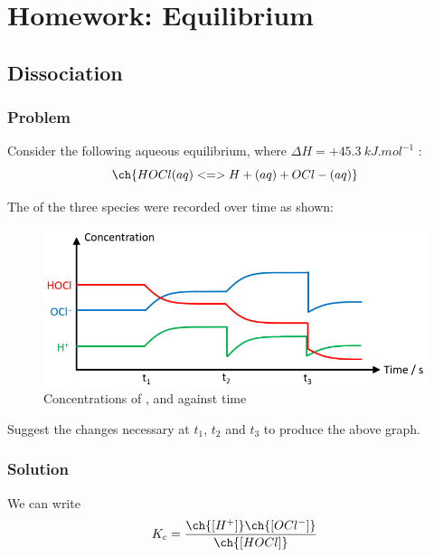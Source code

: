 \documentclass[12pt, a4paper, twoside]{pancake-book}
\begin{document}
\section{Homework: Equilibrium}
\subsection{Dissociation}
\subsubsection{Problem}
Consider the following aqueous equilibrium,
where \(\Delta H = +\qty{45.3}{kJ.mol^{-1}}\)
:
\begin{equation}
	\ch{HOCl (aq) <=> H+ (aq) + OCl- (aq)}
	\label{eq:hocl}
\end{equation}

The  of the three species were recorded over time as shown:
\begin{figure}[htpb]
	\centering
	\includegraphics[width=0.80\linewidth]{assets/07_hocl_concentrations.png}
	\caption{Concentrations of ,  and  against time}
	\label{fig:hocl}
\end{figure}

Suggest the changes necessary at \(t_1\), \(t_2\) and \(t_3\) to produce the
above graph.

\subsubsection{Solution}

We can write
\begin{equation}
	K_c = \frac{\ch{[H^{+}]} \ch{[OCl^-]}}{\ch{[HOCl]}}
	\label{eq:hocl-kc}
\end{equation}
\end{document}
